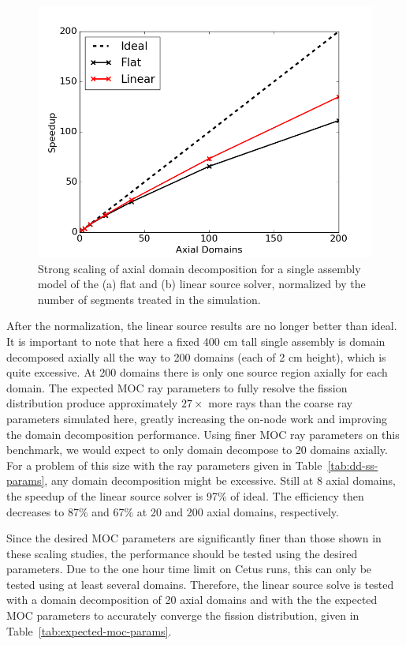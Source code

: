\begin{figure}[h!]
	\centering
	\includegraphics[width=0.7\linewidth]{figures/DD/sa-scaling-fs-ls-ts-norm.png}
	\caption[]{Strong scaling of axial domain decomposition for a single assembly model of the (a) flat and (b) linear source solver, normalized by the number of segments treated in the simulation.}
	\label{fig:strong-scaling-single-assembly-normalized}
\end{figure}

After the normalization, the linear source results are no longer better than ideal. It is important to note that here a fixed 400 cm tall single assembly is domain decomposed axially all the way to 200 domains (each of 2 cm height), which is quite excessive. At 200 domains there is only one source region axially for each domain. The expected \ac{MOC} ray parameters to fully resolve the fission distribution produce approximately $27\times$ more rays than the coarse ray parameters simulated here, greatly increasing the on-node work and improving the domain decomposition performance. Using finer \ac{MOC} ray parameters on this benchmark, we would expect to only domain decompose to 20 domains axially. For a problem of this size with the ray parameters given in Table~\ref{tab:dd-ss-params}, any domain decomposition might be excessive. Still at 8 axial domains, the speedup of the linear source solver is 97\% of ideal. The efficiency then decreases to 87\% and 67\% at 20 and 200 axial domains, respectively.

Since the desired \ac{MOC} parameters are significantly finer than those shown in these scaling studies, the performance should be tested using the desired parameters. Due to the one hour time limit on Cetus runs, this can only be tested using at least several domains. Therefore, the linear source solve is tested with a domain decomposition of 20 axial domains and with the the expected \ac{MOC} parameters to accurately converge the fission distribution, given in Table~\ref{tab:expected-moc-params}.


